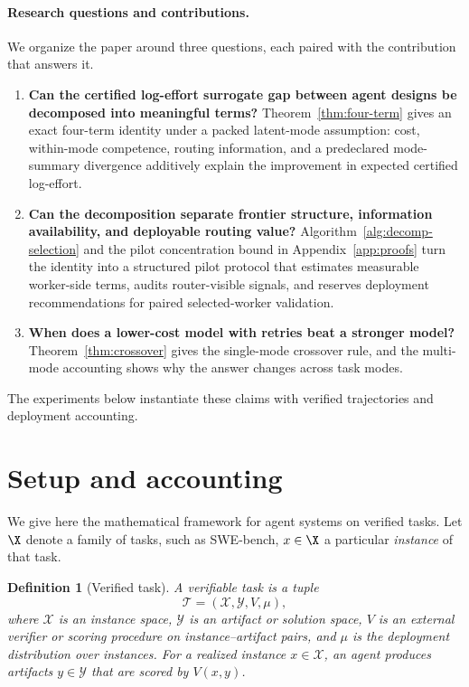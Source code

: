 \documentclass{article}
\newtheorem{definition}{Definition}
\begin{document}
\paragraph{Research questions and contributions.}
We organize the paper around three questions, each paired with the contribution that answers it.

\begin{enumerate}[leftmargin=1.4em,itemsep=0.15em]
  \item \textbf{Can the certified log-effort surrogate gap between agent designs be decomposed into meaningful terms?}
  Theorem~\ref{thm:four-term} gives an exact four-term identity under a packed latent-mode assumption: cost, within-mode competence, routing information, and a predeclared mode-summary divergence additively explain the improvement in expected certified log-effort.
  \item \textbf{Can the decomposition separate frontier structure, information availability, and deployable routing value?}
  Algorithm~\ref{alg:decomp-selection} and the pilot concentration bound in Appendix~\ref{app:proofs} turn the identity into a structured pilot protocol that estimates measurable worker-side terms, audits router-visible signals, and reserves deployment recommendations for paired selected-worker validation.
  \item \textbf{When does a lower-cost model with retries beat a stronger model?}
  Theorem~\ref{thm:crossover} gives the single-mode crossover rule, and the multi-mode accounting shows why the answer changes across task modes.
\end{enumerate}

The experiments below instantiate these claims with verified trajectories and deployment accounting.

\section{Setup and accounting}
\label{sec:framework}

We give here the mathematical framework for agent systems on verified tasks. Let \(\X\) denote a family of tasks, such as
SWE-bench, \(x\in\X\) a particular \textit{instance} of that task.

\begin{definition}[Verified task]
\label{def:verified-task}
A verifiable task is a tuple
\[
\mathcal T=(\mathcal X,\mathcal Y,V,\mu),
\]
where $\mathcal X$ is an instance space, $\mathcal Y$ is an artifact or solution space,
$V$ is an external verifier or scoring procedure on instance--artifact pairs, and
$\mu$ is the deployment distribution over instances.
For a realized instance $x\in\mathcal X$, an agent produces artifacts $y\in\mathcal Y$ that are scored by $V(x,y)$.
\end{definition}
\end{document}
